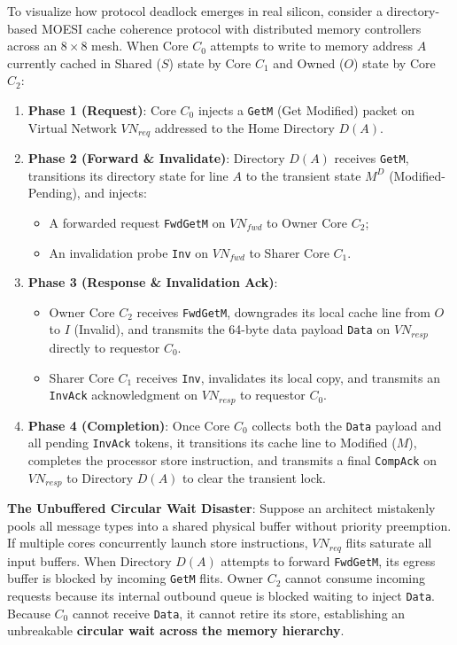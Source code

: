 To visualize how protocol deadlock emerges in real silicon, consider a directory-based MOESI cache coherence protocol with distributed memory controllers across an $8 \times 8$ mesh. When Core $C_0$ attempts to write to memory address $A$ currently cached in Shared ($S$) state by Core $C_1$ and Owned ($O$) state by Core $C_2$:
\begin{enumerate}
    \item \textbf{Phase 1 (Request)}: Core $C_0$ injects a \texttt{GetM} (Get Modified) packet on Virtual Network $VN_{req}$ addressed to the Home Directory $D(A)$.
    \item \textbf{Phase 2 (Forward \& Invalidate)}: Directory $D(A)$ receives \texttt{GetM}, transitions its directory state for line $A$ to the transient state $M^D$ (Modified-Pending), and injects:
    \begin{itemize}
        \item A forwarded request \texttt{FwdGetM} on $VN_{fwd}$ to Owner Core $C_2$;
        \item An invalidation probe \texttt{Inv} on $VN_{fwd}$ to Sharer Core $C_1$.
    \end{itemize}
    \item \textbf{Phase 3 (Response \& Invalidation Ack)}:
    \begin{itemize}
        \item Owner Core $C_2$ receives \texttt{FwdGetM}, downgrades its local cache line from $O$ to $I$ (Invalid), and transmits the 64-byte data payload \texttt{Data} on $VN_{resp}$ directly to requestor $C_0$.
        \item Sharer Core $C_1$ receives \texttt{Inv}, invalidates its local copy, and transmits an \texttt{InvAck} acknowledgment on $VN_{resp}$ to requestor $C_0$.
    \end{itemize}
    \item \textbf{Phase 4 (Completion)}: Once Core $C_0$ collects both the \texttt{Data} payload and all pending \texttt{InvAck} tokens, it transitions its cache line to Modified ($M$), completes the processor store instruction, and transmits a final \texttt{CompAck} on $VN_{resp}$ to Directory $D(A)$ to clear the transient lock.
\end{enumerate}

\begin{svgraybox}
\textbf{The Unbuffered Circular Wait Disaster}: Suppose an architect mistakenly pools all message types into a shared physical buffer without priority preemption. If multiple cores concurrently launch store instructions, $VN_{req}$ flits saturate all input buffers. When Directory $D(A)$ attempts to forward \texttt{FwdGetM}, its egress buffer is blocked by incoming \texttt{GetM} flits. Owner $C_2$ cannot consume incoming requests because its internal outbound queue is blocked waiting to inject \texttt{Data}. Because $C_0$ cannot receive \texttt{Data}, it cannot retire its store, establishing an unbreakable \textbf{circular wait across the memory hierarchy}.
\end{svgraybox}

